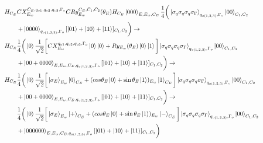 \documentclass{article}
\begin{document}
\begin{equation}
   \resizebox{.9\hsize}{!}{$\begin{split}
        H_{C_E}&CX_{E_w}^{\bar{C}_E,q_{o1},q_{o2},q_{o3},\Gamma_o}CRy_{E_w}^{C_E,\bar{C}_1,\bar{C}_2}(\theta_E)H_{C_E}\ket{000}_{E,E_w,C_E}
        \frac{1}{4}\bigg(
        \ket{\sigma_q\sigma_q\sigma_q\sigma_\Gamma}_{q_{o(1,2,3)},\Gamma_{o}}\ket{00}_{C_1,C_2}\\&+
        \ket{0000}_{q_{o(1,2,3)},\Gamma_o}[\ket{01}+\ket{10}+\ket{11}]_{C_1,C_2}\bigg)\to\\
        H_{C_E}&\frac{1}{4}\bigg(\ket{0}\frac{1}{\sqrt{2}}\bigg[CX_{E_w}^{q_{o1},q_{o2},q_{o3},\Gamma_o}\ket{0}\ket{0}+Ry_{E_w}(\theta_E)\ket{0}\ket{1}\bigg]
        \ket{\sigma_q\sigma_q\sigma_q\sigma_\Gamma}_{q_{o(1,2,3)},\Gamma_{o}}\ket{00}_{C_1,C_2}\\&+
        \ket{00+0000}_{E,E_w,C_E,q_{o(1,2,3)},\Gamma_o}[\ket{01}+\ket{10}+\ket{11}]_{C_1,C_2}\bigg)\to\\
        H_{C_E}&\frac{1}{4}\bigg(\ket{0}\frac{1}{\sqrt{2}}\bigg[\ket{\sigma_E}_{E_w}\ket{0}_{C_E}+(cos\theta_E\ket{0}+\sin\theta_E\ket{1})_{E_w}\ket{1}_{C_E}\bigg]\ket{\sigma_q\sigma_q\sigma_q\sigma_\Gamma}_{q_{o(1,2,3)},\Gamma_{o}}\ket{00}_{C_1,C_2}\\&+
        \ket{00+0000}_{E,E_w,C_E,q_{o(1,2,3)},\Gamma_o}[\ket{01}+\ket{10}+\ket{11}]_{C_1,C_2}\bigg)\to\\
        &\frac{1}{4}\bigg(\ket{0}\frac{1}{\sqrt{2}}\bigg[\ket{\sigma_E}_{E_w}\ket{+}_{C_E}+(cos\theta_E\ket{0}+\sin\theta_E\ket{1})_{E_w}\ket{-}_{C_E}\bigg]\ket{\sigma_q\sigma_q\sigma_q\sigma_\Gamma}_{q_{o(1,2,3)},\Gamma_{o}}\ket{00}_{C_1,C_2}\\&+
        \ket{000000}_{E,E_w,C_E,q_{o(1,2,3)},\Gamma_o}[\ket{01}+\ket{10}+\ket{11}]_{C_1,C_2}\bigg)\\
   \end{split}$}
\end{equation}
\end{document}
